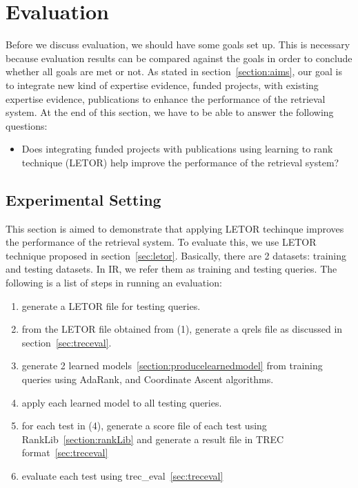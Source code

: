 
\section{Evaluation}

Before we discuss evaluation, we should have some goals set up. This is necessary because evaluation results can be compared against the goals in order to
conclude whether all goals are met or not. As stated in section~\ref{section:aims}, our goal is to integrate new kind of expertise evidence, funded projects,
with existing expertise evidence, publications to enhance the performance of the retrieval system. At the end of this section, we have to be able to 
answer the following questions:

\begin{itemize}
 \item Does integrating funded projects with publications using learning to rank technique (LETOR) help improve the performance of the retrieval system?
\end{itemize}


\subsection{Experimental Setting}
This section is aimed to demonstrate that applying LETOR techinque improves the performance of the retrieval system. To evaluate this, we use LETOR
technique proposed in section~\ref{sec:letor}. Basically, there are 2 datasets: training and testing datasets. In IR, 
we refer them as training and testing queries. The following is a list of steps in running an evaluation:
\begin{enumerate}
 \item generate a LETOR file for testing queries.
 \item from the LETOR file obtained from (1), generate a qrels file as discussed in section~\ref{sec:treceval}.
 \item generate 2 learned models~\ref{section:producelearnedmodel} from training queries using AdaRank, and Coordinate Ascent algorithms.
 \item apply each learned model to all testing queries.
 \item for each test in (4), generate a score file of each test using RankLib~\ref{section:rankLib} and generate a result file in TREC format~\ref{sec:treceval}
 \item evaluate each test using trec\_eval~\ref{sec:treceval}
\end{enumerate}

